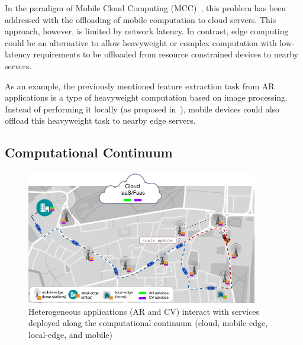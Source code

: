 In the paradigm of Mobile Cloud Computing (MCC)~\cite{Khan:14}, this problem has been addressed with the offloading of mobile computation to cloud servers. This approach, however, is limited by network latency. In contrast, edge computing could be an alternative to allow heavyweight or complex computation with low-latency requirements to be offloaded from resource constrained devices to nearby servers.


As an example, the previously mentioned feature extraction task from AR applications is a type of heavyweight computation based on image processing. Instead of performing it locally (as proposed in~\cite{Huang2012}), mobile devices could also offload this heavyweight task to nearby edge servers. 

\subsection{Computational Continuum}


\begin{figure}[tbp]
	\includegraphics[width=0.9\textwidth]{figs/continuum.png}
	\caption{Heterogeneous applications (AR and CV) interact with services deployed along the computational continuum (cloud, mobile-edge, local-edge, and mobile)}
	\label{fig:continuum}
\end{figure}


